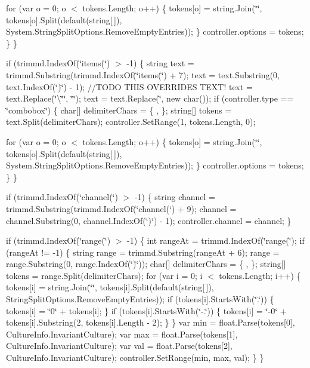 for (var o = 0; o \texorpdfstring{$<$}{<} tokens.\+Length; o++) \{ tokens\mbox{[}o\mbox{]} = string.\+Join(\char`\"{}\char`\"{}, tokens\mbox{[}o\mbox{]}.Split(default(string\mbox{[}$\,$\mbox{]}), System.\+String\+Split\+Options.\+Remove\+Empty\+Entries)); \} controller.\+options = tokens; \} \}

if (trimmd.\+Index\+Of(\char`\"{}items(\char`\"{}) \texorpdfstring{$>$}{>} -\/1) \{ string text = trimmd.\+Substring(trimmd.\+Index\+Of(\char`\"{}items(\char`\"{}) + 7); text = text.\+Substring(0, text.\+Index\+Of(\char`\"{})\char`\"{}) -\/ 1); //\+TODO THIS OVERRIDES TEXT! text = text.\+Replace(\char`\"{}\textbackslash{}\char`\"{}\char`\"{}, \char`\"{}\char`\"{}); text = text.\+Replace(\textquotesingle{}\char`\"{}\textquotesingle{}, new char()); if (controller.\+type == \char`\"{}combobox\char`\"{}) \{ char\mbox{[}\mbox{]} delimiter\+Chars = \{ \textquotesingle{},\textquotesingle{} \}; string\mbox{[}\mbox{]} tokens = text.\+Split(delimiter\+Chars); controller.\+Set\+Range(1, tokens.\+Length, 0);

for (var o = 0; o \texorpdfstring{$<$}{<} tokens.\+Length; o++) \{ tokens\mbox{[}o\mbox{]} = string.\+Join(\char`\"{}\char`\"{}, tokens\mbox{[}o\mbox{]}.Split(default(string\mbox{[}$\,$\mbox{]}), System.\+String\+Split\+Options.\+Remove\+Empty\+Entries)); \} controller.\+options = tokens; \} \}

if (trimmd.\+Index\+Of(\char`\"{}channel(\char`\"{}) \texorpdfstring{$>$}{>} -\/1) \{ string channel = trimmd.\+Substring(trimmd.\+Index\+Of(\char`\"{}channel(\char`\"{}) + 9); channel = channel.\+Substring(0, channel.\+Index\+Of(\char`\"{})\char`\"{}) -\/ 1); controller.\+channel = channel; \}

if (trimmd.\+Index\+Of(\char`\"{}range(\char`\"{}) \texorpdfstring{$>$}{>} -\/1) \{ int range\+At = trimmd.\+Index\+Of(\char`\"{}range(\char`\"{}); if (range\+At != -\/1) \{ string range = trimmd.\+Substring(range\+At + 6); range = range.\+Substring(0, range.\+Index\+Of(\char`\"{})\char`\"{})); char\mbox{[}\mbox{]} delimiter\+Chars = \{ \textquotesingle{},\textquotesingle{} \}; string\mbox{[}\mbox{]} tokens = range.\+Split(delimiter\+Chars); for (var i = 0; i \texorpdfstring{$<$}{<} tokens.\+Length; i++) \{ tokens\mbox{[}i\mbox{]} = string.\+Join(\char`\"{}\char`\"{}, tokens\mbox{[}i\mbox{]}.Split(default(string\mbox{[}$\,$\mbox{]}), String\+Split\+Options.\+Remove\+Empty\+Entries)); if (tokens\mbox{[}i\mbox{]}.Starts\+With(\char`\"{}.\char`\"{})) \{ tokens\mbox{[}i\mbox{]} = \char`\"{}0\char`\"{} + tokens\mbox{[}i\mbox{]}; \} if (tokens\mbox{[}i\mbox{]}.Starts\+With(\char`\"{}-\/.\char`\"{})) \{ tokens\mbox{[}i\mbox{]} = \char`\"{}-\/0\char`\"{} + tokens\mbox{[}i\mbox{]}.Substring(2, tokens\mbox{[}i\mbox{]}.Length -\/ 2); \} \} var min = float.\+Parse(tokens\mbox{[}0\mbox{]}, Culture\+Info.\+Invariant\+Culture); var max = float.\+Parse(tokens\mbox{[}1\mbox{]}, Culture\+Info.\+Invariant\+Culture); var val = float.\+Parse(tokens\mbox{[}2\mbox{]}, Culture\+Info.\+Invariant\+Culture); controller.\+Set\+Range(min, max, val); \} \}

